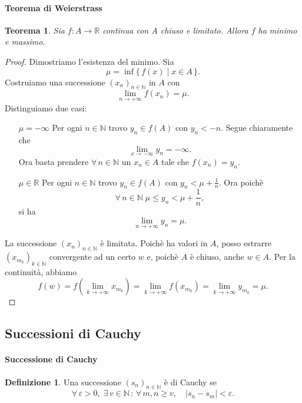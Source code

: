 \documentclass{article}
\theoremstyle{plain}
\newtheorem{thm}{Teorema}[section]
\theoremstyle{definition}
\newtheorem{defn}{Definizione}[section]
\theoremstyle{remark}
\begin{document}
\paragraph{Teorema di Weierstrass}
\begin{bxthm}
\begin{thm}
    Sia $f:A\to\mathbb{R}$ continua con $A$ chiuso e limitato. Allora $f$ ha minimo e massimo.
\end{thm}
\end{bxthm}
\begin{proof}
    Dimostriamo l'esistenza del minimo.
    Sia \[\mu=\inf\{\,f(x) \;|\; x\in A\,\}.\] 
    Costruiamo una successione $(x_n)_{n\in\mathbb{N}}$ in $A$ con 
    \[\lim_{n\to+\infty}f(x_n)=\mu.\]
    Distinguiamo due casi:
    \begin{enumerate}
        \item[$\mu=-\infty$]
        Per ogni $n\in\mathbb{N}$ trovo $y_n\in f(A)$ con $y_n<-n$. Segue chiaramente che \[\lim_{x\to-\infty}y_n=-\infty.\]
        Ora basta prendere $\forall\,n\in\mathbb{N}$ un $x_n\in A$ tale che $f(x_n)=y_n$.
        \item[$\mu\in\mathbb{R}$]
        Per ogni $n\in\mathbb{N}$ trovo $y_n\in f(A)$ con $y_n<\mu+\frac{1}{n}$. Ora poichè
        \[\forall\,n\in\mathbb{N}\;\mu\leq y_n<\mu+\frac{1}{n},\] si ha \[\lim_{n\to+\infty}y_n=\mu.\]
    \end{enumerate}
    La successione $(x_n)_{n\in\mathbb{N}}$ è limitata. Poichè ha valori in $A$, posso estrarre $(x_{m_k})_{k\in\mathbb{N}}$ 
    convergente ad un certo $w$ e, poichè $A$ è chiuso, anche $w\in A$. Per la continuità, abbiamo 
    \[f(w)=f\left(\lim_{k\to+\infty}x_{m_k}\right)=\lim_{k\to+\infty}f(x_{m_k})=\lim_{k\to+\infty}y_{m_k}=\mu.\]
\end{proof}

\vspace{10pt}

\subsection{Successioni di Cauchy}

\vspace{10pt}

\paragraph{Successione di Cauchy}
\begin{bxthm}
\begin{defn}
    Una successione $(s_n)_{n\in\mathbb{N}}$ è di Cauchy se 
    \[\forall\,\varepsilon>0,\;\exists\,v\in\mathbb{N}\,:\,\forall\,m,n\geq v,\quad |s_n-s_m|<\varepsilon.\]
\end{defn}
\end{bxthm}
\end{document}

